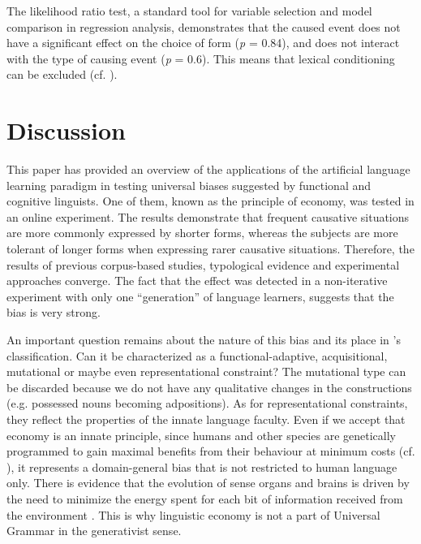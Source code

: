 \documentclass[output=paper]{langsci/langscibook}
\begin{document}
The likelihood ratio test, a standard tool for variable selection and model comparison in regression analysis, demonstrates that the caused event does not have a significant effect on the choice of form (\textit{p} = 0.84), and does not interact with the type of causing event (\textit{p} = 0.6). This means that lexical conditioning can be excluded (cf. \citealt{SmithWonnacott2010}). 

\section{Discussion}

This paper has provided an overview of the applications of the artificial language learning paradigm in testing universal biases suggested by functional and cognitive linguists. One of them, known as the principle of economy, was tested in an online experiment. The results demonstrate that frequent causative situations are more commonly expressed by shorter forms, whereas the subjects are more tolerant of longer forms when expressing rarer causative situations. Therefore, the results of previous corpus-based studies, typological evidence and experimental approaches converge. The fact that the effect was detected in a non-iterative experiment with only one “generation” of language learners, suggests that the bias is very strong.

An important question remains about the nature of this bias and its place in \citet{Haspelmath 2019 (this volume)}'s classification. Can it be characterized as a functional-adaptive, acquisitional, mutational or maybe even representational constraint? The mutational type can be discarded because we do not have any qualitative changes in the constructions (e.g. possessed nouns becoming adpositions). As for representational constraints, they reflect the properties of the innate language faculty. Even if we accept that economy is an innate principle, since humans and other species are genetically programmed to gain maximal benefits from their behaviour at minimum costs (cf. \citealt{ParkerSmith1990}), it represents a domain-general bias that is not restricted to human language only. There is evidence that the evolution of sense organs and brains is driven by the need to minimize the energy spent for each bit of information received from the environment \citep[3]{Stone2015}. This is why linguistic economy is not a part of Universal Grammar in the generativist sense. 
\end{document}
